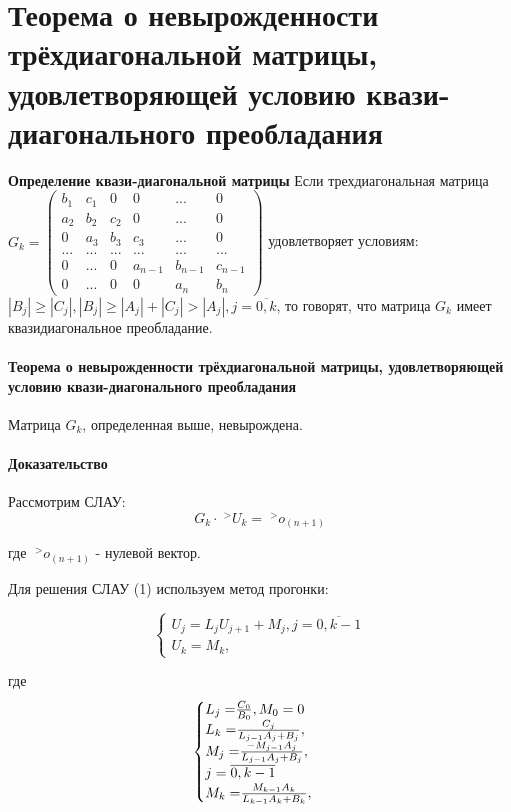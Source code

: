 \documentclass[__main__.tex]{subfiles}
\begin{document}
\section{Теорема о невырожденности трёхдиагональной матрицы, удовлетворяющей условию квази-диагонального преобладания}


\textbf{Определение квази-диагональной матрицы}
	Если трехдиагональная матрица $G_k = \left(
	\begin{matrix}
	b_1 & c_1 & 0 & 0 & ... & 0 \\
	a_2 & b_2 & c_2 & 0 &... & 0 \\
	0 & a_3 & b_3 & c_3 & ... & 0 \\
	... & ... & ... & ... & ... & ...\\
	0 & ... & 0 & a_{n-1} & b_{n-1} & c_{n-1} \\
	0 & ... & 0 & 0 & a_{n} & b_{n}
	\end{matrix}
	\right)$ удовлетворяет условиям: $ |B_j|  \geq  |C_j|, |B_j|  \geq |A_j| + |C_j| > |A_j|, j = \overline{0,k}$, то говорят, что матрица $G_k$ имеет квазидиагональное преобладание.

	\paragraph{Теорема о невырожденности трёхдиагональной матрицы, удовлетворяющей условию квази-диагонального преобладания}
	
		Матрица $G_k$, определенная выше, невырождена.

\paragraph{Доказательство}
	Рассмотрим СЛАУ:
	\begin{equation}\label{13.1}
	
	G_k \cdot \;^{>}U_{k} = \;^{>}o_{(n+1)}
	\end{equation}
	
	 где $\;^{>}o_{(n+1)}$ - нулевой вектор.
	 
	 Для решения СЛАУ (1) используем метод прогонки:
	 
	 \begin{equation}\label{13.2}
	 \begin{cases}
	 U_j = L_j U_{j+1} + M_j , j = \overline{0,k-1} \\
	 U_k = M_k,
	 \end{cases}
\end{equation}

где 
 \begin{equation}
\begin{cases}\label{13.3}
L_j = $${C_{0}}\over{B_0}$$ , M_0 = 0 \\
L_k = $${C_{j}}\over{L_{j-1}A_j + B_j}$$,\\
M_j = $${-M_{j-1}A_j}\over{L_{j-1}A_j + B_j}$$,\\ 
j = \overline{0,k-1} \\
M_k = $${M_{k-1}A_k}\over{L_{k-1}A_k + B_k}$$,
\end{cases}
\end{equation}
\end{document}
